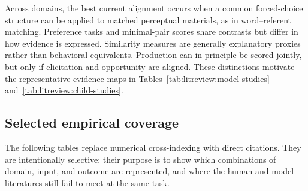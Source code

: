 Across domains, the best current alignment occurs when a common forced-choice structure can be applied to matched perceptual materials, as in word--referent matching. Preference tasks and minimal-pair scores share contrasts but differ in how evidence is expressed. Similarity measures are generally explanatory proxies rather than behavioral equivalents. Production can in principle be scored jointly, but only if elicitation and opportunity are aligned. These distinctions motivate the representative evidence maps in Tables~\ref{tab:litreview:model-studies} and~\ref{tab:litreview:child-studies}.

\subsection{Selected empirical coverage}
\label{sec:litreview:selected-studies}

The following tables replace numerical cross-indexing with direct citations. They are intentionally selective: their purpose is to show which combinations of domain, input, and outcome are represented, and where the human and model literatures still fail to meet at the same task.


